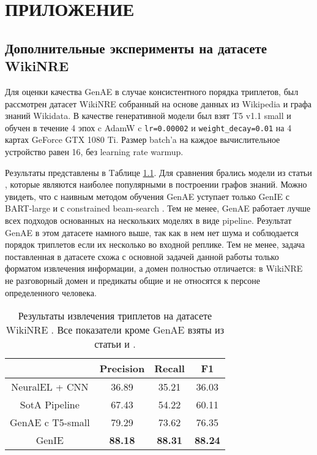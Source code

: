\appendix
\chapter{\centering\normalsize{ПРИЛОЖЕНИЕ}}
\section{Дополнительные эксперименты на датасете WikiNRE} \label{AppendixA}

Для оценки качества GenAE в случае консистентного порядка триплетов, был рассмотрен датасет WikiNRE собранный на основе данных из Wikipedia и графа знаний Wikidata. В качестве генеративной модели был взят T5 v1.1 small и обучен в течение 4 эпох c AdamW c \texttt{lr=0.00002} и \texttt{weight\_decay=0.01} на 4 картах GeForce GTX 1080 Ti. Размер batch'a на каждое вычислительное устройство равен 16, без learning rate warmup.

Результаты представлены в Tаблице \ref{table:wikinre_results}. Для сравнения брались модели из статьи \cite{genie}, которые являются наиболее популярными в построении графов знаний. Можно увидеть, что с наивным методом обучения GenAE уступает только GenIE с BART-large \cite{bart} и с constrained beam-search \cite{seq2seq}. Тем не менее, GenAE работает лучше всех подходов основанных на нескольких моделях в виде pipeline. Результат GenAE в этом датасете намного выше, так как в нем нет шума и соблюдается порядок триплетов если их несколько во входной реплике. Тем не менее, задача поставленная в датасете схожа с основной задачей данной работы только форматом извлечения информации, а домен полностью отличается: в WikiNRE не разговорный домен и предикаты общие и не относятся к персоне определенного человека.

\begin{table}[!ht]
\centering
\begin{tabular}{c c c c}
    & Precision & Recall & F1 \\
    \hline
    \hline
    NeuralEL + CNN & 36.89 & 35.21 & 36.03 \\
    \hline
    SotA Pipeline & 67.43 & 54.22 & 60.11  \\
    \hline
    GenAE c T5-small & 79.29 & 73.62 & 76.35 \\
    \hline
    GenIE & \textbf{88.18} & \textbf{88.31} & \textbf{88.24}  \\
    \hline
\end{tabular}
\caption{Результаты извлечения триплетов на датасете WikiNRE \cite{trisedya-etal-2019-neural}. Все показатели кроме GenAE взяты из статьи \cite{genie} и \cite{trisedya-etal-2019-neural}.}
\label{table:wikinre_results}
\end{table}

